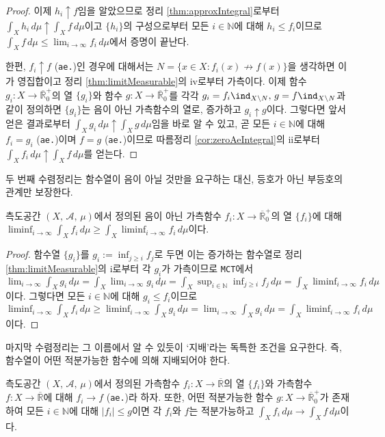 \begin{proof}
    이제 $h_i\uparrow f$임을 알았으므로 정리 \ref{thm:approxIntegral}로부터 $\int_Xh_i\,d\mu\uparrow\int_Xf\,d\mu$이고 $\{h_i\}$의 구성으로부터 모든 $i\in\mathbb{N}$에 대해  $h_i\leq f_i$이므로 $\int_Xf\,d\mu\leq\lim_{i\to\infty}f_i\,d\mu$에서 증명이 끝난다.

    한편, $f_i\uparrow f$ (\texttt{ae.})인 경우에 대해서는 $N=\{x\in X:f_i(x)\not\to f(x)\}$을 생각하면 이가 영집합이고 정리 \ref{thm:limitMeasurable}의 iv로부터 가측이다. 이제 함수 $g_i:X\to\overline{\mathbb{R}}^+_0$의 열 $\{g_i\}$와 함수 $g:X\to\overline{\mathbb{R}}^+_0$를 각각 $g_i=f_i\ind_{X\setminus N},\,g=f\ind_{X\setminus N}$과 같이 정의하면 $\{g_i\}$는 음이 아닌 가측함수의 열로, 증가하고 $g_i\uparrow g$이다. 그렇다면 앞서 얻은 결과로부터 $\int_Xg_i\,d\mu\uparrow\int_Xg\,d\mu$임을 바로 알 수 있고, 곧 모든 $i\in\mathbb{N}$에 대해 $f_i=g_i$ (\texttt{ae.})이며 $f=g$ (\texttt{ae.})이므로 따름정리 \ref{cor:zeroAeIntegral}의 ii로부터 $\int_Xf_i\,d\mu\uparrow\int_Xf\,d\mu$를 얻는다.
\end{proof}

두 번째 수렴정리는 함수열이 음이 아닐 것만을 요구하는 대신, 등호가 아닌 부등호의 관계만 보장한다.

\begin{theorem}
    측도공간 $(X,\,\mathcal{A},\,\mu)$에서 정의된 음이 아닌 가측함수 $f_i:X\to\overline{\mathbb{R}}^+_0$의 열 $\{f_i\}$에 대해 $\liminf_{i\to\infty}\int_Xf_i\,d\mu\geq\int_X\liminf_{i\to\infty}f_i\,d\mu$이다.
\end{theorem}

\begin{proof}
    함수열 $\{g_i\}$를 $g_i:=\inf_{j\geq i}f_j$로 두면 이는 증가하는 함수열로 정리 \ref{thm:limitMeasurable}의 i로부터 각 $g_i$가 가측이므로 \texttt{MCT}에서 $\lim_{i\to\infty}\int_Xg_i\,d\mu=\int_X\lim_{i\to\infty}g_i\,d\mu=\int_X\sup_{i\in\mathbb{N}}\inf_{j\geq i}f_j\,d\mu=\int_X\liminf_{i\to\infty}f_i\,d\mu$이다. 그렇다면 모든 $i\in\mathbb{N}$에 대해 $g_i\leq f_i$이므로 $\liminf_{i\to\infty}\int_Xf_i\,d\mu\geq\liminf_{i\to\infty}\int_Xg_i\,d\mu=\lim_{i\to\infty}\int_Xg_i\,d\mu=\int_X\liminf_{i\to\infty}f_i\,d\mu$이다.
\end{proof}

마지막 수렴정리는 그 이름에서 알 수 있듯이 `지배'라는 독특한 조건을 요구한다. 즉, 함수열이 어떤 적분가능한 함수에 의해 지배되어야 한다.

\begin{theorem}
    측도공간 $(X,\,\mathcal{A},\,\mu)$에서 정의된 가측함수 $f_i:X\to\overline{\mathbb{R}}$의 열 $\{f_i\}$와 가측함수 $f:X\to\overline{\mathbb{R}}$에 대해 $f_i\to f$ (\texttt{ae.})라 하자. 또한, 어떤 적분가능한 함수 $g:X\to\overline{\mathbb{R}}^+_0$가 존재하여 모든 $i\in\mathbb{N}$에 대해 $|f_i|\leq g$이면 각 $f_i$와 $f$는 적분가능하고 $\int_Xf_i\,d\mu\to\int_Xf\,d\mu$이다.
\end{theorem}

